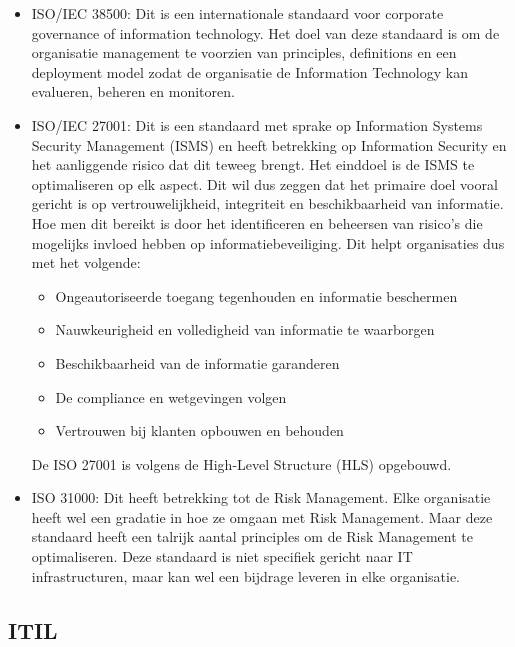 \begin{itemize}
    \item ISO/IEC 38500:
    Dit is een internationale standaard voor corporate governance of information technology. Het doel van deze standaard is om de organisatie management te voorzien van principles, definitions en een deployment model zodat de organisatie de Information Technology kan evalueren, beheren en monitoren. \autocite{Mikkola2021}
    \item ISO/IEC 27001:
    Dit is een standaard met sprake op Information Systems Security Management (ISMS) en heeft betrekking op Information Security en het aanliggende risico dat dit teweeg brengt. Het einddoel is de ISMS te optimaliseren op elk aspect. \autocite{AlMayahi2012}
    Dit wil dus zeggen dat het primaire doel vooral gericht is op vertrouwelijkheid, integriteit en beschikbaarheid van informatie. Hoe men dit bereikt is door het identificeren en beheersen van risico's die mogelijks invloed hebben op informatiebeveiliging.
    Dit helpt organisaties dus met het volgende:
    \begin{itemize}
        \item Ongeautoriseerde toegang tegenhouden en informatie beschermen
        \item Nauwkeurigheid en volledigheid van informatie te waarborgen
        \item Beschikbaarheid van de informatie garanderen
        \item De compliance en wetgevingen volgen
        \item Vertrouwen bij klanten opbouwen en behouden
    \end{itemize}

    De ISO 27001 is volgens de High-Level Structure (HLS) opgebouwd.
    
    \item ISO 31000:
    Dit heeft betrekking tot de Risk Management. Elke organisatie heeft wel een gradatie in hoe ze omgaan met Risk Management. Maar deze standaard heeft een talrijk aantal principles om de Risk Management te optimaliseren. \autocite{Florea2016}
    Deze standaard is niet specifiek gericht naar IT infrastructuren, maar kan wel een bijdrage leveren in elke organisatie. 
\end{itemize}


\subsection{ITIL}


